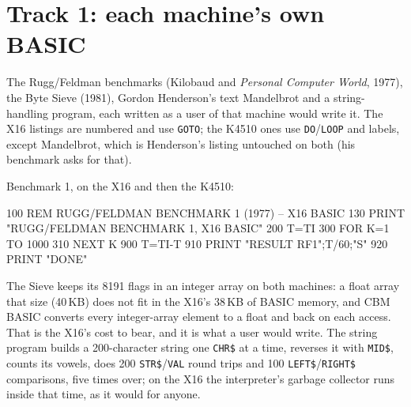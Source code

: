 \section{Track 1: each machine's own BASIC}
The Rugg/Feldman benchmarks (Kilobaud and \emph{Personal
Computer World}, 1977), the Byte Sieve (1981), Gordon
Henderson's text Mandelbrot and a string-handling program,
each written as a user of that machine would write it. The
X16 listings are numbered and use \texttt{GOTO}; the K4510
ones use \texttt{DO}/\texttt{LOOP} and labels, except
Mandelbrot, which is Henderson's listing untouched on both
(his benchmark asks for that).

Benchmark 1, on the X16 and then the K4510:

\begin{type}
100 REM RUGG/FELDMAN BENCHMARK 1 (1977) -- X16 BASIC
130 PRINT "RUGG/FELDMAN BENCHMARK 1, X16 BASIC"
200 T=TI
300 FOR K=1 TO 1000
310 NEXT K
900 T=TI-T
910 PRINT "RESULT RF1";T/60;"S"
920 PRINT "DONE"
\end{type}


The Sieve keeps its 8191 flags in an integer array on both
machines: a float array that size (40\,KB) does not fit in the
X16's 38\,KB of BASIC memory, and CBM BASIC converts every
integer-array element to a float and back on each access.
That is the X16's cost to bear, and it is what a user would
write. The string program builds a 200-character string one
\texttt{CHR\$} at a time, reverses it with \texttt{MID\$},
counts its vowels, does 200 \texttt{STR\$}/\texttt{VAL} round
trips and 100 \texttt{LEFT\$}/\texttt{RIGHT\$} comparisons,
five times over; on the X16 the interpreter's garbage
collector runs inside that time, as it would for anyone.


